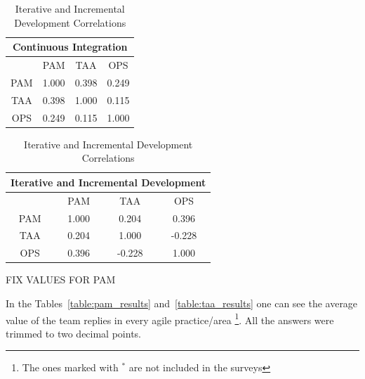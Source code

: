 \begin{table}
 \RawFloats %
 \begin{minipage}{.45\textwidth}
  \caption{Continuous Integration Correlations}
  \label{table:ci_correlations}
  \begin{tabular}{| c | c | c | c | } \hline
  \multicolumn{4}{|c|}{\textbf{Continuous Integration}}  \\ \hline
   & PAM & TAA & OPS \\ \hline
  PAM & 1.000 & 0.398 & 0.249 \\ \hline
  TAA & 0.398 & 1.000 & 0.115 \\ \hline
  OPS & 0.249 & 0.115 & 1.000 \\ \hline
 \end{tabular}
 \end{minipage}%
%
 \begin{minipage}{.45\textwidth}
  \centering
   \caption{Iterative and Incremental Development Correlations}
  \label{table:iid_correlations}
  \begin{tabular}{| c | c | c | c |} \hline
  \multicolumn{4}{|c|}{\textbf{Iterative and Incremental Development}}  \\ \hline
  & PAM & TAA & OPS \\ \hline
  PAM & 1.000 & 0.204 & 0.396 \\ \hline
  TAA & 0.204 & 1.000 & -0.228 \\ \hline
  OPS & 0.396 & -0.228 & 1.000 \\ \hline
 \end{tabular}
 \end{minipage}%
\end{table}


FIX VALUES FOR PAM


In the Tables~\ref{table:pam_results} and~\ref{table:taa_results} one can see the average value of the team replies in every agile practice/area \footnote{The ones  marked with $^\ast$ are not included in the surveys}. All the answers were trimmed to two decimal points.


